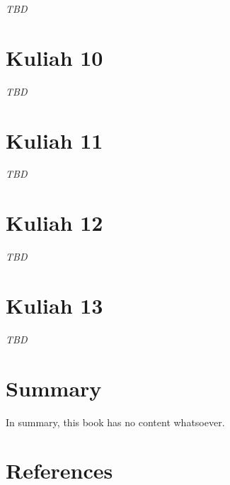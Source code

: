 \documentclass[
  letterpaper,
  DIV=11,
  numbers=noendperiod]{scrreprt}
\begin{document}
\emph{TBD}


\chapter{Kuliah 10}\label{kuliah-10}

\emph{TBD}


\chapter{Kuliah 11}\label{kuliah-11}

\emph{TBD}


\chapter{Kuliah 12}\label{kuliah-12}

\emph{TBD}


\chapter{Kuliah 13}\label{kuliah-13}

\emph{TBD}


\chapter{Summary}\label{summary}

In summary, this book has no content whatsoever.


\chapter*{References}\label{references}


\label{refs}
\end{document}
